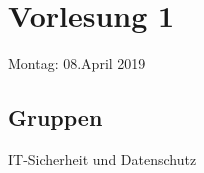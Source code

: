 \section{Vorlesung 1}
\label{sec:Vorlesung1}
Montag: 08.April 2019

\subsection{Gruppen} 
\label{sec:gruppen}
IT-Sicherheit und Datenschutz
